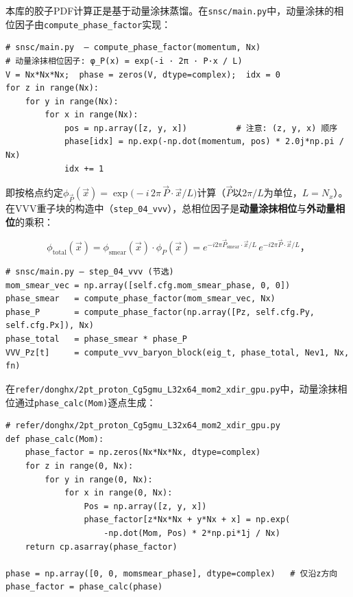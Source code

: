 \documentclass[12pt,a4paper]{ctexart}
\theoremstyle{definition}
\begin{document}
本库的胶子PDF计算正是基于动量涂抹蒸馏。在\texttt{snsc/main.py}中，动量涂抹的相位因子由\texttt{compute\_phase\_factor}实现：

\begin{verbatim}
# snsc/main.py  — compute_phase_factor(momentum, Nx)
# 动量涂抹相位因子: φ_P(x) = exp(-i · 2π · P·x / L)
V = Nx*Nx*Nx;  phase = zeros(V, dtype=complex);  idx = 0
for z in range(Nx):
    for y in range(Nx):
        for x in range(Nx):
            pos = np.array([z, y, x])          # 注意: (z, y, x) 顺序
            phase[idx] = np.exp(-np.dot(momentum, pos) * 2.0j*np.pi / Nx)
            idx += 1
\end{verbatim}

即按格点约定$\phi_{\vec{P}}(\vec{x}) = \exp\!\big(-i\,2\pi\,\vec{P}\cdot\vec{x}/L\big)$计算（$\vec{P}$以$2\pi/L$为单位，$L=N_x$）。在VVV重子块的构造中（\texttt{step\_04\_vvv}），总相位因子是\textbf{动量涂抹相位}与\textbf{外动量相位}的乘积：

\begin{equation}
\phi_{\text{total}}(\vec{x}) = \phi_{\text{smear}}(\vec{x}) \cdot \phi_{P}(\vec{x})
= e^{-i 2\pi \vec{P}_{\text{smear}}\cdot\vec{x}/L}\, e^{-i 2\pi \vec{P}\cdot\vec{x}/L}，
\label{eq:phase_total}
\end{equation}

\begin{verbatim}
# snsc/main.py — step_04_vvv (节选)
mom_smear_vec = np.array([self.cfg.mom_smear_phase, 0, 0])
phase_smear   = compute_phase_factor(mom_smear_vec, Nx)
phase_P       = compute_phase_factor(np.array([Pz, self.cfg.Py, self.cfg.Px]), Nx)
phase_total   = phase_smear * phase_P
VVV_Pz[t]     = compute_vvv_baryon_block(eig_t, phase_total, Nev1, Nx, fn)
\end{verbatim}

在\texttt{refer/donghx/2pt\_proton\_Cg5gmu\_L32x64\_mom2\_xdir\_gpu.py}中，动量涂抹相位通过\texttt{phase\_calc(Mom)}逐点生成：

\begin{verbatim}
# refer/donghx/2pt_proton_Cg5gmu_L32x64_mom2_xdir_gpu.py
def phase_calc(Mom):
    phase_factor = np.zeros(Nx*Nx*Nx, dtype=complex)
    for z in range(0, Nx):
        for y in range(0, Nx):
            for x in range(0, Nx):
                Pos = np.array([z, y, x])
                phase_factor[z*Nx*Nx + y*Nx + x] = np.exp(
                    -np.dot(Mom, Pos) * 2*np.pi*1j / Nx)
    return cp.asarray(phase_factor)

phase = np.array([0, 0, momsmear_phase], dtype=complex)   # 仅沿z方向
phase_factor = phase_calc(phase)
\end{verbatim}
\end{document}
